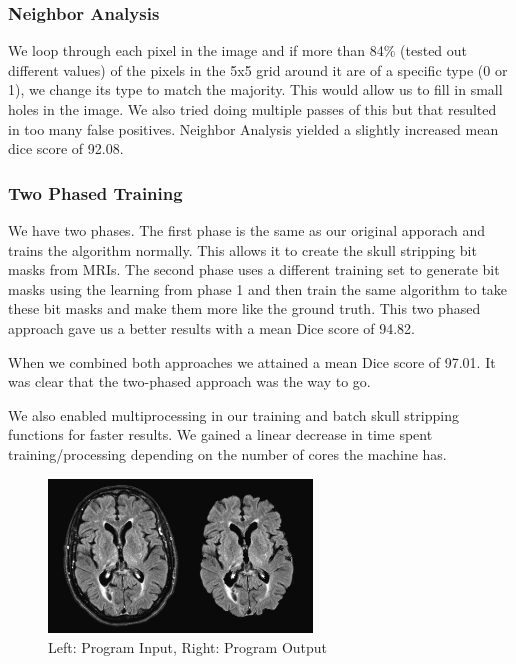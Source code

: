 \documentclass[letterpaper, 10 pt, conference]{ieeeconf}
\begin{document}
\subsubsection{Neighbor Analysis}
We loop through each pixel in the image and if more than 84\% (tested out different values) of the pixels in the 5x5 grid around it are of a specific type (0 or 1), we change its type to match the majority. This would allow us to fill in small holes in the image. We also tried doing  multiple passes of this but that resulted in too many false positives. Neighbor Analysis yielded a slightly increased mean dice score of 92.08.
\subsubsection{Two Phased Training}
We have two phases. The first phase is the same as our original apporach and trains the algorithm normally. This allows it to create the skull stripping bit masks from MRIs. The second phase uses a different training set to generate bit masks using the learning from phase 1 and then train the same algorithm to take these bit masks and make them more like the ground truth. This two phased approach gave us a better results with a mean Dice score of 94.82.

When we combined both approaches we attained a mean Dice score of 97.01. It was clear that the two-phased approach was the way to go.

We also enabled multiprocessing in our training and batch skull stripping functions for faster results. We gained a linear decrease in time spent training/processing depending on the number of cores the machine has.

\begin{figure}
\centering
\includegraphics[width=7cm]{res.png}
\caption{Left: Program Input, Right: Program Output}
\end{figure}
\end{document}

